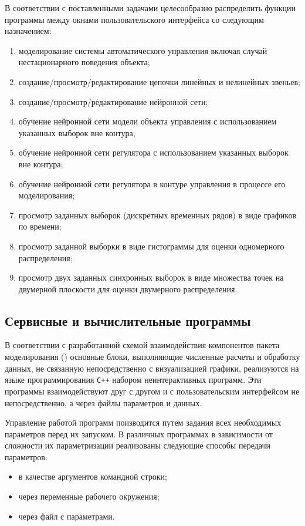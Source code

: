 В соответствии с поставленными задачами целесообразно распределить
функции программы между окнами пользовательского интерфейса со
следующим назначением:
\begin{enumerate}
\item моделирование системы автоматического управления включая случай
  нестационарного поведения объекта;
\item создание/просмотр/редактирование цепочки линейных и нелинейных
  звеньев;
\item создание/просмотр/редактирование нейронной сети;
\item обучение нейронной сети модели объекта управления с
  использованием указанных выборок вне контура;
\item обучение нейронной сети регулятора с использованием указанных
  выборок вне контура;
\item обучение нейронной сети регулятора в контуре управления в
  процессе его моделирования;
\item просмотр заданных выборок (дискретных временных рядов) в виде
  графиков по времени;
\item просмотр заданной выборки в виде гистограммы для оценки
  одномерного распределения;
\item просмотр двух заданных синхронных выборок в виде множества точек
  на двумерной плоскости для оценки двумерного распределения.
\end{enumerate}

\subsection{Сервисные и вычислительные программы}

В соответствии с разработанной схемой взаимодействия компонентов
пакета моделирования () основные
блоки, выполняющие численные расчеты и обработку данных, не связанную
непосредственно с визуализацией графики, реализуются на языке
программирования {\tt C++} набором неинтерактивных программ.  Эти
программы взаимодействуют друг с другом и с пользовательским
интерфейсом не непосредственно, а через файлы параметров и данных.

Управление работой программ поизводится путем задания всех необходимых
параметров перед их запуском.  В различных программах в зависимости от
сложности их параметризации реализованы следующие способы передачи
параметров:
\begin{itemize}
\item в качестве аргументов командной строки;
\item через переменные рабочего окружения;
\item через файл с параметрами.
\end{itemize}

